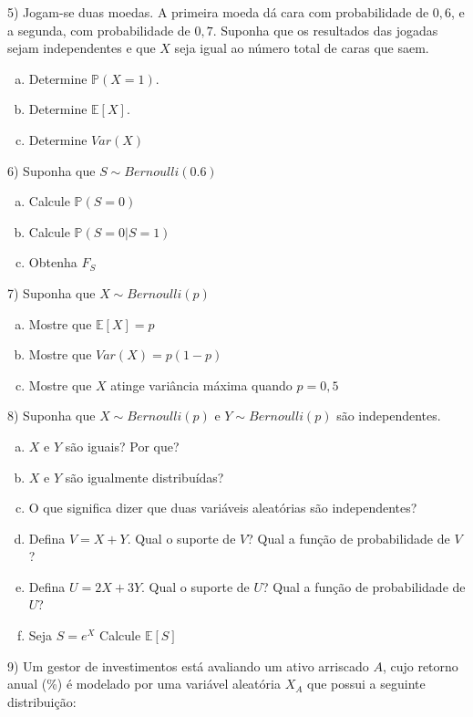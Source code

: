 \documentclass[12pt]{article}
\begin{document}
5) Jogam-se duas moedas. A primeira moeda dá cara com probabilidade de $0{,}6$, e a segunda, com probabilidade de $0{,}7$. Suponha que os resultados das jogadas sejam independentes e que $X$ seja igual ao número total de caras que saem.

\begin{enumerate}[(a)]
    \item Determine $\mathds{P}(X = 1)$.
    \item Determine $\mathds{E}[X]$.
    \item Determine $Var(X)$
\end{enumerate}

6) Suponha que $S \sim Bernoulli(0.6)$ 
\begin{enumerate}[(a)]
    \item Calcule $\mathds{P}(S=0)$
    \item Calcule $\mathds{P}(S=0|S=1)$
    \item Obtenha $F_S$
\end{enumerate}

7) Suponha que $X \sim Bernoulli(p)$
\begin{enumerate}[(a)]
    \item Mostre que $\mathds{E}[X] = p$
    \item Mostre que $Var(X) = p(1-p)$
    \item Mostre que $X$ atinge variância máxima quando $p=0,5$
\end{enumerate}

8) Suponha que $X \sim Bernoulli(p)$ e $Y \sim Bernoulli(p)$ são independentes.
\begin{enumerate}[a)]
    \item $X$ e $Y$ são iguais? Por que?
    \item $X$ e $Y$ são igualmente distribuídas?
    \item O que significa dizer que duas variáveis aleatórias são independentes?
    \item Defina $V = X+Y$. Qual o suporte de $V$? Qual a função de probabilidade de $V$?
    \item Defina $U =2X + 3Y$. Qual o suporte de $U$? Qual a função de probabilidade de $U$? 
    \item Seja $S=e^X$ Calcule $\mathds{E}[S]$
\end{enumerate}

9) Um gestor de investimentos está avaliando um ativo arriscado $A$, cujo retorno anual (\%) é modelado por
uma variável aleatória $X_A$ que possui a seguinte distribuição:
\end{document}
